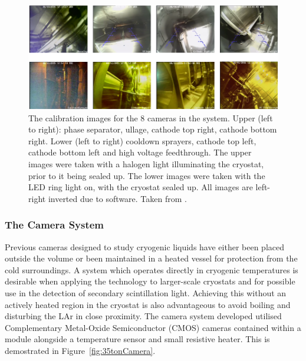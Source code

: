 \begin{figure}
  \centering
  \includegraphics[width=15cm]{35tonCamerasImages.pdf}
  \caption{The calibration images for the 8 cameras in the system.  Upper (left to right): phase separator, ullage, cathode top right, cathode bottom right.  Lower (left to right) cooldown sprayers, cathode top left, cathode bottom left and high voltage feedthrough.  The upper images were taken with a halogen light illuminating the cryostat, prior to it being sealed up.  The lower images were taken with the LED ring light on, with the cryostat sealed up. All images are left-right inverted due to software.  Taken from \cite{35tonCameras2017}.}
  \label{fig:35tonCamerasImages}
\end{figure}

\subsubsection{The Camera System}\label{sec:35tonCameraSystem}

Previous cameras designed to study cryogenic liquids have either been placed outside the volume or been maintained in a heated vessel for protection from the cold surroundings.  A system which operates directly in cryogenic temperatures is desirable when applying the technology to larger-scale cryostats and for possible use in the detection of secondary scintillation light.  Achieving this without an actively heated region in the cryostat is also advantageous to avoid boiling and disturbing the LAr in close proximity.  The camera system developed utilised Complementary Metal-Oxide Semiconductor (CMOS) cameras contained within a module alongside a temperature sensor and small resistive heater.  This is demostrated in Figure~\ref{fig:35tonCamera}.

